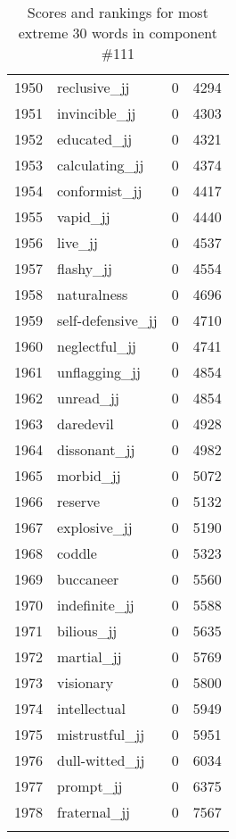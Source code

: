 \begin{longtable}[!htbp]{| rlr@{.}l |}
    1950 & reclusive\_jj & 0 & 4294 \\
    1951 & invincible\_jj & 0 & 4303 \\
    1952 & educated\_jj & 0 & 4321 \\
    1953 & calculating\_jj & 0 & 4374 \\
    1954 & conformist\_jj & 0 & 4417 \\
    1955 & vapid\_jj & 0 & 4440 \\
    1956 & live\_jj & 0 & 4537 \\
    1957 & flashy\_jj & 0 & 4554 \\
    1958 & naturalness & 0 & 4696 \\
    1959 & self-defensive\_jj & 0 & 4710 \\
    1960 & neglectful\_jj & 0 & 4741 \\
    1961 & unflagging\_jj & 0 & 4854 \\
    1962 & unread\_jj & 0 & 4854 \\
    1963 & daredevil & 0 & 4928 \\
    1964 & dissonant\_jj & 0 & 4982 \\
    1965 & morbid\_jj & 0 & 5072 \\
    1966 & reserve & 0 & 5132 \\
    1967 & explosive\_jj & 0 & 5190 \\
    1968 & coddle & 0 & 5323 \\
    1969 & buccaneer & 0 & 5560 \\
    1970 & indefinite\_jj & 0 & 5588 \\
    1971 & bilious\_jj & 0 & 5635 \\
    1972 & martial\_jj & 0 & 5769 \\
    1973 & visionary & 0 & 5800 \\
    1974 & intellectual & 0 & 5949 \\
    1975 & mistrustful\_jj & 0 & 5951 \\
    1976 & dull-witted\_jj & 0 & 6034 \\
    1977 & prompt\_jj & 0 & 6375 \\
    1978 & fraternal\_jj & 0 & 7567 \\
    \hline
    \caption{Scores and rankings for most extreme 30 words in component \#111} \\
\end{longtable}
